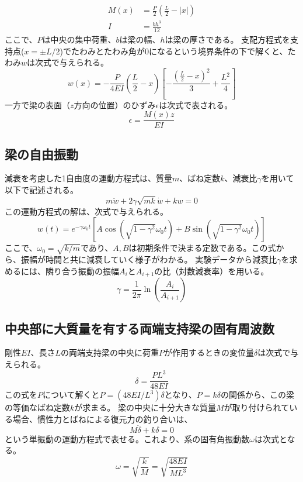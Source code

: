 \documentclass[a4j]{jarticle}
\begin{document}
\begin{align}
\label{eq:3point}
    M(x) &= \frac{P}{2} \left( \frac{L}{2} - |x| \right)\\
    I &= \frac{bh^3}{12}
\end{align}
ここで、$P$は中央の集中荷重、$b$は梁の幅、$h$は梁の厚さである。
支配方程式を支持点($x=\pm L/2$)でたわみとたわみ角が0になるという境界条件の下で解くと、たわみ$w$は次式で与えられる。
\begin{equation}
    w(x) = -\frac{P}{4EI} \left( \frac{L}{2}-x \right) \left[ -\frac{(\frac{L}{2}-x)^2}{3} + \frac{L^2}{4} \right]
    \label{eq:deflection}
\end{equation}
一方で梁の表面（$z$方向の位置）のひずみ$\epsilon$は次式で表される。
\begin{equation}
    \epsilon = \frac{M(x)z}{EI}
    \label{eq:strain}
\end{equation}

\subsection{梁の自由振動}
減衰を考慮した1自由度の運動方程式は、質量$m$、ばね定数$k$、減衰比$\gamma$を用いて以下で記述される。
\begin{equation}
    m\ddot{w} + 2\gamma\sqrt{mk}\dot{w} + kw = 0
    \label{eq:free_vibration_gov}
\end{equation}
この運動方程式の解は、次式で与えられる。
\begin{equation}
    w(t) = e^{-\gamma\omega_{0}t} \left[ A\cos \left( \sqrt{1-\gamma^2}\omega_{0}t \right) + B\sin \left( \sqrt{1-\gamma^2}\omega_{0}t \right) \right]
    \label{eq:free_vibration_sol}
\end{equation}
ここで、$\omega_0 = \sqrt{k/m}$であり、$A, B$は初期条件で決まる定数である。この式から、振幅が時間と共に減衰していく様子がわかる。
実験データから減衰比$\gamma$を求めるには、隣り合う振動の振幅$A_i$と$A_{i+1}$の比（対数減衰率）を用いる。
$$
\gamma = \frac{1}{2\pi} \ln \left( \frac{A_i}{A_{i+1}} \right)
$$

\subsection{中央部に大質量を有する両端支持梁の固有周波数}
剛性$EI$、長さ$L$の両端支持梁の中央に荷重$P$が作用するときの変位量$\delta$は次式で与えられる。
\begin{equation}
    \delta = \frac{PL^3}{48EI}
    \label{eq:static_deflection_center}
\end{equation}
この式を$P$について解くと$P = (48EI/L^3)\delta$となり、$P=k\delta$の関係から、この梁の等価なばね定数$k$が求まる。
梁の中央に十分大きな質量$M$が取り付けられている場合、慣性力とばねによる復元力の釣り合いは、
\begin{equation}
    M\ddot{\delta} + k\delta = 0
    \label{eq:mass_beam_gov}
\end{equation}
という単振動の運動方程式で表せる。これより、系の固有角振動数$\omega$は次式となる。
\begin{equation}
    \omega = \sqrt{\frac{k}{M}} = \sqrt{\frac{48EI}{ML^3}}
    \label{eq:natural_freq}
\end{equation}
\end{document}
